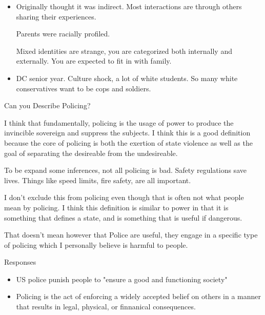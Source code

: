 \documentclass{report}
\begin{document}
\begin{description}
\begin{itemize}
            \item 
                Originally thought it was indirect. Most interactions are through
                others sharing their experiences.

                Parents were racially profiled.

                Mixed identities are strange, you are categorized both internally
                and externally. You are expected to fit in with family.

            \item 
                DC senior year. Culture shock, a lot of white students. So many
                white conservatives want to be cops and soldiers. 
        \end{itemize}
        \pagebreak
    \item {\large Can you Describe Policing?}
        \begin{mdframed}
            I think that fundamentally, policing is the usage of power
            to produce the invincible sovereign and suppress the subjects. 
            \vspace{20}
            \hline
            \vspace{20}
            I think this is a good definition because the core 
            of policing is both the exertion of state violence
            as well as the goal of separating the desireable
            from the undesireable.

            To be expand some inferences, not all policing is
            bad. Safety regulations save lives. Things like
            speed limits, fire safety, are all important.

            I don't exclude this from policing even though that
            is often not what people mean by policing. I think
            this definition is similar to power in that it is
            something that defines a state, and is something that
            is useful if dangerous.

            That doesn't mean however that Police are useful, they
            engage in a specific type of policing which I personally
            believe is harmful to people.
            
        \end{mdframed}
    \item {\large Responses}
        \begin{mdframed}
            \begin{itemize}
                \item US police punish people to "ensure a good and functioning society"
                \item Policing is the act of enforcing a widely accepted belief on others
                    in a manner that results in legal, physical, or finnanical consequences.


\end{itemize}
\end{mdframed}
\end{description}
\end{document}
